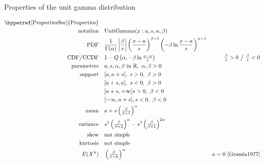 

\begin{table*}[t!]
\caption[Unit gamma distribution -- Properties]{Properties of the unit gamma distribution}
\begin{align*}
\text{\hyperref[PropertiesSec]{Properties}}  \quad& \\
\text{notation} \quad & \text{UnitGamma}(x\given a,s,\alpha,\beta) 
\\
\text{PDF}\quad &  \frac{1}{\Gamma(\alpha)} \left|\frac{\beta}{ s}\right|
\left(\frac{x-a}{s}\right)^{\beta-1} \left(-\beta \ln   \frac{x-a}{s} \right)^{\alpha-1} \checked
\\
\text{CDF} \big/ \text{CCDF}  \quad  & 1-Q\left(\alpha, -\beta \ln \tfrac{x-a}{s} \right)
& \tfrac{\beta}{s}  >0 \ \big{/} \ \tfrac{\beta}{s}<0   \checked
\\
\text{parameters}\quad &   a, s,\alpha,\beta \text{ in } \Real  ,\  \alpha, \beta>0
\\
\text{support}\checked \quad 
	&   [a,a+s] ,\ s>0,\ \beta>0 \\
	&  [a+s,a], \ s<0,\ \beta>0 \\
	& [a+s,+\infty]  s>0,\ \beta<0  \\
 	& [-\infty,a+s], s<0,\ \beta<0 \\
\text{mean} \quad  &  a + s \left(\tfrac{\beta}{\beta+1} \right)^{\alpha} \checked
\\
\text{variance} \quad  & s^2 \left(\tfrac{\beta}{\beta+2} \right)^{\alpha} - s^2 \left(\tfrac{\beta}{\beta+1} \right)^{2\alpha} \checked
\\
\text{skew} \quad  &   \text{not simple}
\\
\text{kurtosis} \quad  &   \text{not simple}
\\
E(X^h) \quad & \left(\tfrac{\beta}{\beta+h} \right)^{\alpha} \qquad  & a=0 \
\text{\cite{Grassia1977}} \checked
\end{align*}
\end{table*}
